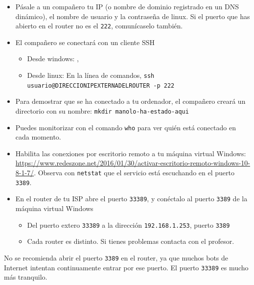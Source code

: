 \begin{homeworkProblem}
  \begin{itemize}
  \item Pásale a un compañero tu IP (o nombre de dominio registrado en un DNS dinámico), el nombre de usuario y la contraseña de linux. Si el puerto que has abierto en el router no es el \texttt{222}, comunícaselo también.
  \item El compañero se conectará con un cliente SSH
    \begin{itemize}
    \item Desde windows: , 
    \item Desde linux: En la línea de comandos, \texttt{ssh usuario@DIRECCIONIPEXTERNADELROUTER -p 222}
    \end{itemize}
    
  \item Para demostrar que se ha conectado a tu ordenador, el compañero creará un directorio con su nombre: \texttt{mkdir manolo-ha-estado-aqui}
  \item Puedes monitorizar con el comando \texttt{who} para ver quién está conectado en cada momento.
  \end{itemize}
  
\end{homeworkProblem}


\begin{homeworkProblem}
  \begin{itemize}
  \item Habilita las conexiones por escritorio remoto a tu máquina virtual Windows: \url{https://www.redeszone.net/2016/01/30/activar-escritorio-remoto-windows-10-8-1-7/}. Observa con \texttt{netstat} que el servicio está escuchando en el puerto \texttt{3389}.
  \item En el router de tu ISP abre el puerto \texttt{33389}, y conéctalo al puerto \texttt{3389} de la máquina virtual Windows
    \begin{itemize}
    \item Del puerto extero \texttt{33389} a la dirección \texttt{192.168.1.253}, puerto \texttt{3389}
    \item Cada router es distinto. Si tienes problemas contacta con el profesor.
    \end{itemize}
  \end{itemize}

  \begin{Aviso}
    No se recomienda abrir el puerto \texttt{3389} en el router, ya que muchos bots de Internet intentan continuamente entrar por ese puerto. El puerto \texttt{33389} es mucho más tranquilo. 
  \end{Aviso}
\end{homeworkProblem}



